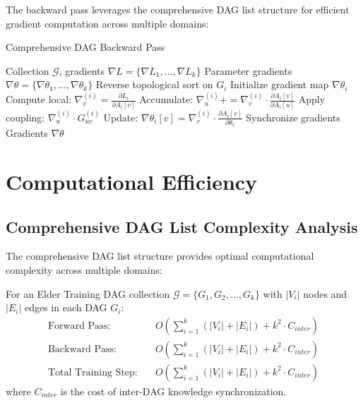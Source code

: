 The backward pass leverages the comprehensive DAG list structure for efficient gradient computation across multiple domains:

\begin{algorithm}[H]
\caption{Comprehensive DAG Backward Pass}
\begin{algorithmic}[1]
\REQUIRE Collection $\mathcal{G}$, gradients $\nabla L = \{\nabla L_1, \ldots, \nabla L_k\}$
\ENSURE Parameter gradients $\nabla \theta = \{\nabla \theta_1, \ldots, \nabla \theta_k\}$
    \STATE Reverse topological sort on $G_i$
    \STATE Initialize gradient map $\nabla \theta_i$
        \STATE Compute local: $\nabla_v^{(i)} = \frac{\partial L_i}{\partial A_i[v]}$
            \STATE Accumulate: $\nabla_u^{(i)} += \nabla_v^{(i)} \cdot \frac{\partial A_i[v]}{\partial A_i[u]}$
            \STATE Apply coupling: $\nabla_u^{(i)} \cdot G_{uv}^{(i)}$
        \ENDFOR
        \STATE Update: $\nabla \theta_i[v] = \nabla_v^{(i)} \cdot \frac{\partial A_i[v]}{\partial \theta_v}$
    \ENDFOR
\ENDFOR
\STATE Synchronize gradients
\RETURN Gradients $\nabla \theta$
\end{algorithmic}
\end{algorithm}

\section{Computational Efficiency}

\subsection{Comprehensive DAG List Complexity Analysis}

The comprehensive DAG list structure provides optimal computational complexity across multiple domains:

\begin{theorem}
For an Elder Training DAG collection $\mathcal{G} = \{G_1, G_2, \ldots, G_k\}$ with $|V_i|$ nodes and $|E_i|$ edges in each DAG $G_i$:
\begin{align}
\text{Forward Pass:} &\quad O\left(\sum_{i=1}^k (|V_i| + |E_i|) + k^2 \cdot C_{inter}\right) \\
\text{Backward Pass:} &\quad O\left(\sum_{i=1}^k (|V_i| + |E_i|) + k^2 \cdot C_{inter}\right) \\
\text{Total Training Step:} &\quad O\left(\sum_{i=1}^k (|V_i| + |E_i|) + k^2 \cdot C_{inter}\right)
\end{align}
where $C_{inter}$ is the cost of inter-DAG knowledge synchronization.
\end{theorem}

